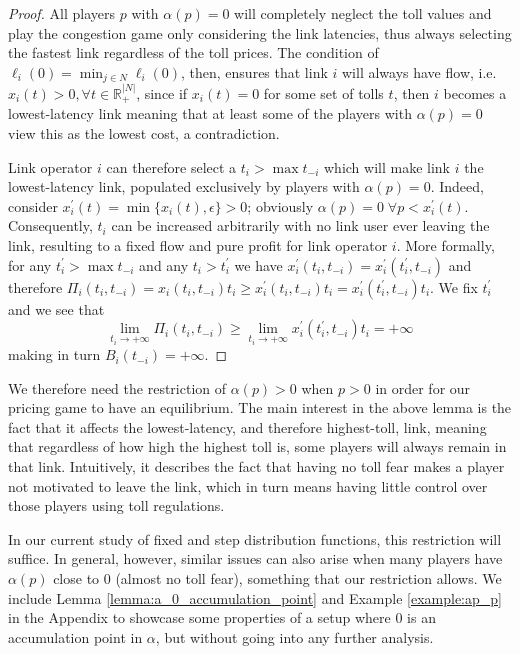 \documentclass[10pt,a4paper]{book}
\newcommand{\R}{\mathbb{R}}
\theoremstyle{definition}
\theoremstyle{comment}
\begin{document}
\begin{proof}
	All players $p$ with $\alpha(p) = 0$ will completely neglect the toll values and play the congestion game only considering the link latencies, thus always selecting the fastest link regardless of the toll prices.
	The condition of $\ell_i(0) = \min_{j \in N} \ell_i(0)$, then, ensures that link $i$ will always have flow, i.e. $x_i(t) > 0, \forall t \in \R_+^{|N|}$, since if $x_i(t) = 0$ for some set of tolls $t$, then $i$ becomes a lowest-latency link meaning that at least some of the players with $\alpha(p) = 0$ view this as the lowest cost, a contradiction.
 
	Link operator $i$ can therefore select a $t_i > \max t_{-i}$ which will make link $i$ the lowest-latency link, populated exclusively by players with $\alpha(p) = 0$.
	Indeed, consider $x_i^\prime(t) = \min\{x_i(t), \epsilon\} > 0$; obviously $\alpha(p) = 0 \; \forall p < x_i^\prime(t)$.
	Consequently, $t_i$ can be increased arbitrarily with no link user ever leaving the link, resulting to a fixed flow and pure profit for link operator $i$.
	More formally, for any $t_i^\prime > \max t_{-i}$ and any $t_i > t_i^\prime$ we have $x_i^\prime(t_i, t_{-i}) = x_i^\prime(t_i^\prime, t_{-i})$ and therefore $\Pi_i(t_i, t_{-i}) = x_i(t_i, t_{-i}) t_i \ge x_i^\prime(t_i, t_{-i}) t_i = x_i^\prime(t_i^\prime, t_{-i})t_i$.
	We fix $t_i^\prime$ and we see that
	\[
		\lim_{t_i \rightarrow +\infty} \Pi_i(t_i, t_{-i}) \ge \lim_{t_i \rightarrow +\infty} x_i^\prime(t_i^\prime, t_{-i})t_i = +\infty
	\]
	making in turn $B_i(t_{-i}) = +\infty$.
\end{proof}
We therefore need the restriction of $\alpha(p) > 0$ when $p > 0$ in order for our pricing game to have an equilibrium.
The main interest in the above lemma is the fact that it affects the lowest-latency, and therefore highest-toll, link, meaning that regardless of how high the highest toll is, some players will always remain in that link.
Intuitively, it describes the fact that having no toll fear makes a player not motivated to leave the link, which in turn means having little control over those players using toll regulations.

In our current study of fixed and step distribution functions, this restriction will suffice.
In general, however, similar issues can also arise when many players have $\alpha(p)$ close to $0$ (almost no toll fear), something that our restriction allows.
We include Lemma \ref{lemma:a_0_accumulation_point} and Example \ref{example:ap_p} in the Appendix to showcase some properties of a setup where $0$ is an accumulation point in $\alpha$, but without going into any further analysis.
\end{document}
